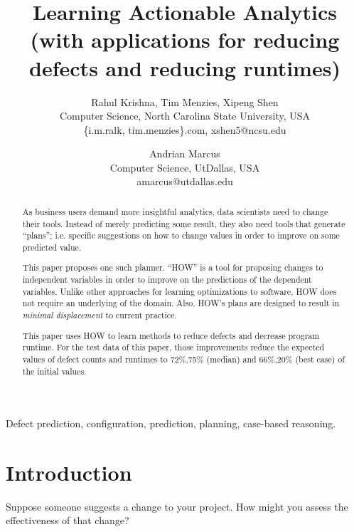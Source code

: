 \documentclass[conference]{IEEEtran}
\title{Learning Actionable Analytics 
 (with applications for reducing defects and reducing runtimes)}
\author{
%
%
Rahul Krishna, Tim Menzies, Xipeng Shen\\
        Computer Science, North Carolina State University, USA\\
       \{i.m.ralk, tim.menzies\}\@gmail.com, xshen5@ncsu.edu
\and
 Andrian Marcus\\
       Computer Science, UtDallas, USA \\
       amarcus@utdallas.edu }
\begin{document}
  \maketitle
  
  
   
  \begin{abstract}
 As business users demand more insightful
 analytics, data scientists need to change
 their tools. Instead of merely predicting 
 some result, they also need tools that generate ``plans'';
 i.e. specific suggestions on  how to change values in order to
 improve on some predicted value.
 
 This paper proposes one such planner. ``HOW'' is a 
 tool for proposing changes to independent
 variables in order to improve on 
 the predictions of the dependent variables. Unlike other approaches
 for learning optimizations to software, HOW does not require
 an underlying of the domain. Also, HOW's plans
 are designed to result in {\em minimal displacement}
 to current practice.
 
 This paper uses  HOW to learn methods
 to reduce defects and decrease program runtime.
 For the test data of this paper, those improvements   reduce
 the expected values of defect counts and  runtimes to    
 72\%,75\%  (median) and 66\%,20\% (best case) of the initial values.
  \end{abstract}
  \begin{IEEEkeywords}
Defect prediction, configuration, prediction, planning, case-based reasoning.
  \end{IEEEkeywords}
  
\section{Introduction}
Suppose someone suggests a change to your project. How might you assess the effectiveness of that change?
\end{document}
